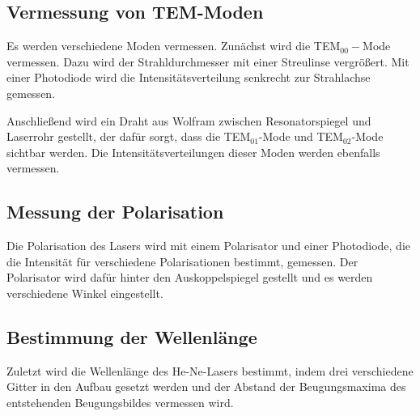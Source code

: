 \subsection{Vermessung von TEM-Moden}
Es werden verschiedene Moden vermessen. Zunächst wird die TEM$_{00}-$Mode vermessen. Dazu wird der Strahldurchmesser mit einer Streulinse vergrößert. Mit einer Photodiode wird die Intensitätsverteilung senkrecht zur Strahlachse gemessen.

Anschließend wird ein Draht aus Wolfram zwischen Resonatorspiegel und Laserrohr gestellt, der dafür sorgt, dass die TEM$_{01}$-Mode und TEM$_{02}$-Mode sichtbar werden. Die Intensitätsverteilungen dieser Moden werden ebenfalls vermessen.


\subsection{Messung der Polarisation}
Die Polarisation des Lasers wird mit einem Polarisator und einer Photodiode, die die Intensität für verschiedene Polarisationen bestimmt, gemessen.
Der Polarisator wird dafür hinter den Auskoppelspiegel gestellt und es werden verschiedene Winkel eingestellt.


\subsection{Bestimmung der Wellenlänge}
Zuletzt wird die Wellenlänge des He-Ne-Lasers bestimmt, indem drei verschiedene Gitter in den Aufbau gesetzt werden und der Abstand der Beugungsmaxima des entstehenden Beugungsbildes vermessen wird.